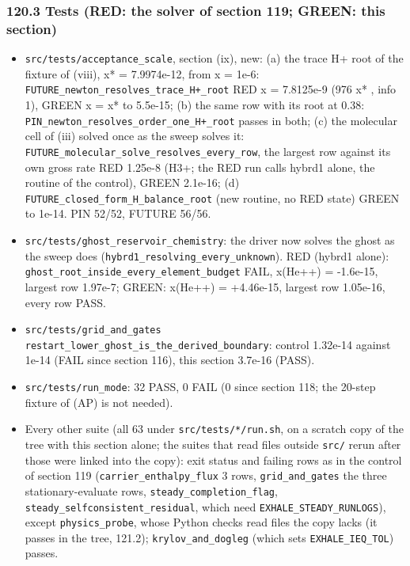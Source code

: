 \documentclass[english,a4paper]{my_memo}
\providecommand{\tightlist}{\setlength{\itemsep}{0pt}\setlength{\parskip}{0pt}}
\begin{document}
\subsubsection{120.3 Tests (RED: the solver of section 119; GREEN: this section)}\label{1203-tests-red-the-solver-of-section-119-green-this-section}

\begin{itemize}
\tightlist
\item
  \texttt{src/tests/acceptance\_scale}, section (ix), new: (a) the trace H+ root of
  the fixture of (viii), x* = 7.9974e-12, from x = 1e-6:
  \texttt{FUTURE\_newton\_resolves\_trace\_H+\_root} RED x = 7.8125e-9 (976 x* , info 1),
  GREEN x = x* to 5.5e-15; (b) the same row with its root at 0.38:
  \texttt{PIN\_newton\_resolves\_order\_one\_H+\_root} passes in both; (c) the molecular
  cell of (iii) solved once as the sweep solves it:
  \texttt{FUTURE\_molecular\_solve\_resolves\_every\_row}, the largest row against its
  own gross rate RED 1.25e-8 (H3+; the RED run calls hybrd1 alone, the
  routine of the control), GREEN 2.1e-16; (d)
  \texttt{FUTURE\_closed\_form\_H\_balance\_root} (new routine, no RED state) GREEN to
  1e-14. PIN 52/52, FUTURE 56/56.
\item
  \texttt{src/tests/ghost\_reservoir\_chemistry}: the driver now solves the ghost as
  the sweep does (\texttt{hybrd1\_resolving\_every\_unknown}). RED (hybrd1 alone):
  \texttt{ghost\_root\_inside\_every\_element\_budget} FAIL, x(He++) = -1.6e-15, largest
  row 1.97e-7; GREEN: x(He++) = +4.46e-15, largest row 1.05e-16, every row
  PASS.
\item
  \texttt{src/tests/grid\_and\_gates} \texttt{restart\_lower\_ghost\_is\_the\_derived\_boundary}:
  control 1.32e-14 against 1e-14 (FAIL since section 116), this section
  3.7e-16 (PASS).
\item
  \texttt{src/tests/run\_mode}: 32 PASS, 0 FAIL (0 since section 118; the 20-step
  fixture of (AP) is not needed).
\item
  Every other suite (all 63 under \texttt{src/tests/*/run.sh}, on a scratch copy of
  the tree with this section alone; the suites that read files outside
  \texttt{src/} rerun after those were linked into the copy): exit status and
  failing rows as in the control of section 119 (\texttt{carrier\_enthalpy\_flux} 3 rows,
  \texttt{grid\_and\_gates} the three stationary-evaluate rows,
  \texttt{steady\_completion\_flag}, \texttt{steady\_selfconsistent\_residual}, which need
  \texttt{EXHALE\_STEADY\_RUNLOGS}), except \texttt{physics\_probe}, whose Python checks
  read files the copy lacks (it passes in the tree, 121.2); \texttt{krylov\_and\_dogleg}
  (which sets \texttt{EXHALE\_IEQ\_TOL}) passes.
\end{itemize}
\end{document}
